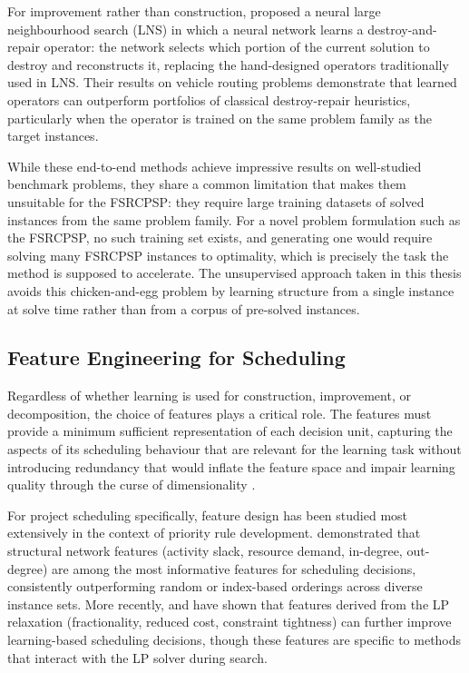 For improvement rather than construction, \cite{Hottung2020} proposed a neural large
neighbourhood search (LNS) in which a neural network learns a destroy-and-repair
operator: the network selects which portion of the current solution to destroy and
reconstructs it, replacing the hand-designed operators traditionally used in LNS. Their
results on vehicle routing problems demonstrate that learned operators can outperform
portfolios of classical destroy-repair heuristics, particularly when the operator is
trained on the same problem family as the target instances.

While these end-to-end methods achieve impressive results on well-studied benchmark
problems, they share a common limitation that makes them unsuitable for the FSRCPSP:
they require large training datasets of solved instances from the same problem family.
For a novel problem formulation such as the FSRCPSP, no such training set exists, and
generating one would require solving many FSRCPSP instances to optimality, which is precisely
the task the method is supposed to accelerate. The unsupervised approach taken in this
thesis avoids this chicken-and-egg problem by learning structure from a single instance
at solve time rather than from a corpus of pre-solved instances.

\subsection*{Feature Engineering for Scheduling}
Regardless of whether learning is used for construction, improvement, or decomposition,
the choice of features plays a critical role. The features must provide a minimum
sufficient representation of each decision unit, capturing the aspects of its scheduling
behaviour that are relevant for the learning task without introducing redundancy that
would inflate the feature space and impair learning quality through the curse of
dimensionality \parencite{Bellman1954, Guyon2003}.

For project scheduling specifically, feature design has been studied most extensively
in the context of priority rule development. \cite{Kolisch1999} demonstrated that
structural network features (activity slack, resource demand, in-degree, out-degree)
are among the most informative features for scheduling decisions, consistently
outperforming random or index-based orderings across diverse instance sets. More
recently, \cite{Hottung2020} and \cite{Khalil2016} have shown that features derived
from the LP relaxation (fractionality, reduced cost, constraint tightness) can further
improve learning-based scheduling decisions, though these features are specific to
methods that interact with the LP solver during search.

